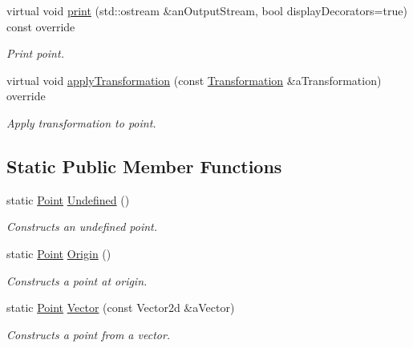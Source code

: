 \begin{DoxyCompactItemize}
virtual void \hyperlink{classlibrary_1_1math_1_1geom_1_1d2_1_1objects_1_1_point_a74bef6325d728e1cb6e70bac0b8d4601}{print} (std\+::ostream \&an\+Output\+Stream, bool display\+Decorators=true) const override
\begin{DoxyCompactList}\small\item\em Print point. \end{DoxyCompactList}\item 
virtual void \hyperlink{classlibrary_1_1math_1_1geom_1_1d2_1_1objects_1_1_point_a71d3ef79dbffcd2568d1a2c6bad807d7}{apply\+Transformation} (const \hyperlink{classlibrary_1_1math_1_1geom_1_1d2_1_1_transformation}{Transformation} \&a\+Transformation) override
\begin{DoxyCompactList}\small\item\em Apply transformation to point. \end{DoxyCompactList}\end{DoxyCompactItemize}
\subsection*{Static Public Member Functions}
\begin{DoxyCompactItemize}
\item 
static \hyperlink{classlibrary_1_1math_1_1geom_1_1d2_1_1objects_1_1_point}{Point} \hyperlink{classlibrary_1_1math_1_1geom_1_1d2_1_1objects_1_1_point_a110a5bba9399abc5408f6c34306040c6}{Undefined} ()
\begin{DoxyCompactList}\small\item\em Constructs an undefined point. \end{DoxyCompactList}\item 
static \hyperlink{classlibrary_1_1math_1_1geom_1_1d2_1_1objects_1_1_point}{Point} \hyperlink{classlibrary_1_1math_1_1geom_1_1d2_1_1objects_1_1_point_ac372ec5b87ab91d58dc515eda2f0fa75}{Origin} ()
\begin{DoxyCompactList}\small\item\em Constructs a point at origin. \end{DoxyCompactList}\item 
static \hyperlink{classlibrary_1_1math_1_1geom_1_1d2_1_1objects_1_1_point}{Point} \hyperlink{classlibrary_1_1math_1_1geom_1_1d2_1_1objects_1_1_point_a3b656a68cb1f75901dc44e109e6eca58}{Vector} (const Vector2d \&a\+Vector)
\begin{DoxyCompactList}\small\item\em Constructs a point from a vector. \end{DoxyCompactList}\end{DoxyCompactItemize}
